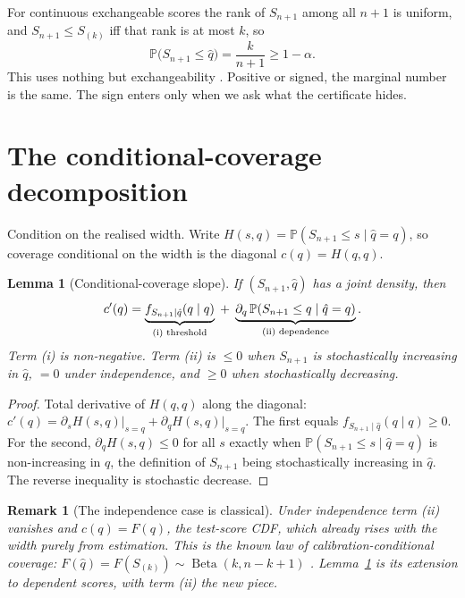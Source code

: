 \documentclass[11pt]{article}
\newtheorem{lemma}{Lemma}
\newtheorem{remark}{Remark}
\begin{document}
For continuous exchangeable scores the rank of $S_{n+1}$ among all $n+1$ is uniform, and
$S_{n+1}\le S_{(k)}$ iff that rank is at most $k$, so
\begin{equation}
\mathbb P\big(S_{n+1}\le\hat q\big)=\frac{k}{n+1}\ge 1-\alpha .
\end{equation}
This uses nothing but exchangeability \citep{vovk2005}. Positive or signed, the marginal
number is the same. The sign enters only when we ask what the certificate hides.

\section{The conditional-coverage decomposition}

Condition on the realised width. Write $H(s,q)=\mathbb P(S_{n+1}\le s\mid\hat q=q)$, so coverage
conditional on the width is the diagonal $c(q)=H(q,q)$.

\begin{lemma}[Conditional-coverage slope]\label{lem:slope}
If $(S_{n+1},\hat q)$ has a joint density, then
\begin{equation}
c'(q)=\underbrace{f_{S_{n+1}\mid\hat q}(q\mid q)}_{\textup{(i) threshold}}
\;+\;\underbrace{\partial_q\,\mathbb P(S_{n+1}\le q\mid\hat q=q)}_{\textup{(ii) dependence}} .
\end{equation}
Term \textup{(i)} is non-negative. Term \textup{(ii)} is $\le 0$ when $S_{n+1}$ is
stochastically increasing in $\hat q$, $=0$ under independence, and $\ge 0$ when stochastically
decreasing.
\end{lemma}

\begin{proof}
Total derivative of $H(q,q)$ along the diagonal: $c'(q)=\partial_s H(s,q)\big|_{s=q}+\partial_q
H(s,q)\big|_{s=q}$. The first equals $f_{S_{n+1}\mid\hat q}(q\mid q)\ge 0$. For the second,
$\partial_q H(s,q)\le 0$ for all $s$ exactly when $\mathbb P(S_{n+1}\le s\mid\hat q=q)$ is
non-increasing in $q$, the definition of $S_{n+1}$ being stochastically increasing in
$\hat q$. The reverse inequality is stochastic decrease.
\end{proof}

\begin{remark}[The independence case is classical]
Under independence term (ii) vanishes and $c(q)=F(q)$, the test-score CDF, which already rises
with the width purely from estimation. This is the known law of calibration-conditional
coverage: $F(\hat q)=F(S_{(k)})\sim\operatorname{Beta}(k,n-k+1)$
\citep{vovk2012,marques2024,angelopoulos2023gentle}. Lemma~\ref{lem:slope} is its extension to
dependent scores, with term (ii) the new piece.
\end{remark}
\end{document}
